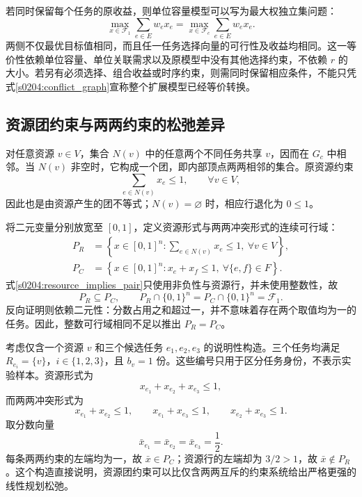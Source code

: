 若同时保留每个任务的原收益，则单位容量模型可以写为最大权独立集问题：
\begin{equation}
 \max_{x\in\mathcal F_1}\sum_{e\in E}w_ex_e
 =\max_{x\in\mathcal F_c}\sum_{e\in E}w_ex_e.
 \label{s0204:weighted_equivalence}
\end{equation}
两侧不仅最优目标值相同，而且任一任务选择向量的可行性及收益均相同。这一等价性依赖单位容量、单位关联需求以及原模型中没有其他选择约束，不依赖 $r$ 的大小。若另有必须选择、组合收益或时序约束，则需同时保留相应条件，不能只凭式\eqref{s0204:conflict_graph}宣称整个扩展模型已经等价转换。

\subsection{资源团约束与两两约束的松弛差异}

对任意资源 $v\in V$，集合 $N(v)$ 中的任意两个不同任务共享 $v$，因而在 $G_c$ 中相邻。当 $N(v)$ 非空时，它构成一个团，即内部顶点两两相邻的集合。原资源约束
\begin{equation}
 \sum_{e\in N(v)}x_e\leq1,
 \qquad \forall v\in V,
 \label{s0204:resource_clique}
\end{equation}
因此也是由资源产生的团不等式；$N(v)=\varnothing$ 时，相应行退化为 $0\leq1$。

将二元变量分别放宽至 $[0,1]$，定义资源形式与两两冲突形式的连续可行域：
\begin{align}
 P_R&=\left\{x\in[0,1]^n:
 \sum_{e\in N(v)}x_e\leq1,\ \forall v\in V\right\},
 \label{s0204:resource_relaxation}\\
 P_C&=\left\{x\in[0,1]^n:
 x_e+x_f\leq1,\ \forall\{e,f\}\in F\right\}.
 \label{s0204:conflict_relaxation}
\end{align}
式\eqref{s0204:resource_implies_pair}只使用非负性与资源行，并未使用整数性，故
\begin{equation}
 P_R\subseteq P_C,
 \qquad
 P_R\cap\{0,1\}^{n}=P_C\cap\{0,1\}^{n}=\mathcal F_1.
 \label{s0204:relaxation_relation}
\end{equation}
反向证明则依赖二元性：分数占用之和超过一，并不意味着存在两个取值均为一的任务。因此，整数可行域相同不足以推出 $P_R=P_C$。

考虑仅含一个资源 $v$ 和三个候选任务 $e_1,e_2,e_3$ 的说明性构造。三个任务均满足 $R_{e_i}=\{v\}$，$i\in\{1,2,3\}$，且 $b_v=1$ 份。这些编号只用于区分任务身份，不表示实验样本。资源形式为
\begin{equation}
 x_{e_1}+x_{e_2}+x_{e_3}\leq1,
 \label{s0204:three_resource_row}
\end{equation}
而两两冲突形式为
\begin{equation}
 x_{e_1}+x_{e_2}\leq1,
 \qquad x_{e_1}+x_{e_3}\leq1,
 \qquad x_{e_2}+x_{e_3}\leq1.
 \label{s0204:three_pair_rows}
\end{equation}
取分数向量
\begin{equation}
 \bar x_{e_1}=\bar x_{e_2}=\bar x_{e_3}=\frac12.
 \label{s0204:half_vector}
\end{equation}
每条两两约束的左端均为一，故 $\bar x\in P_C$；资源行的左端却为 $3/2>1$，故 $\bar x\notin P_R$。这个构造直接说明，资源团约束可以比仅含两两互斥的约束系统给出严格更强的线性规划松弛。


